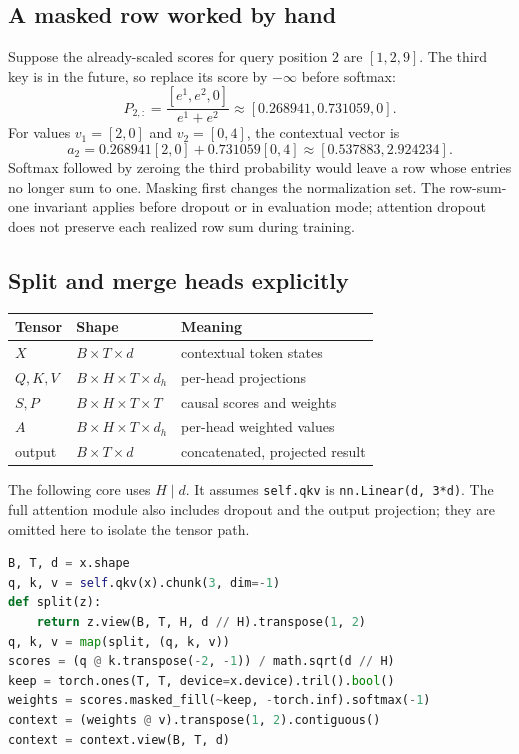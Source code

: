 \documentclass[11pt]{article}
\begin{document}
\subsection{A masked row worked by hand}
Suppose the already-scaled scores for query position $2$ are $[1,2,9]$. The
third key is in the future, so replace its score by $-\infty$ before softmax:
\[
P_{2,:}=\frac{[e^1,e^2,0]}{e^1+e^2}
\approx[0.268941,0.731059,0].
\]
For values $v_1=[2,0]$ and $v_2=[0,4]$, the contextual vector is
\[
a_2=0.268941[2,0]+0.731059[0,4]
\approx[0.537883,2.924234].
\]
Softmax followed by zeroing the third probability would leave a row whose
entries no longer sum to one. Masking first changes the normalization set.
The row-sum-one invariant applies before dropout or in evaluation mode;
attention dropout does not preserve each realized row sum during training.

\subsection{Split and merge heads explicitly}

\begin{center}
\begin{tabular}{lll}
\toprule
Tensor & Shape & Meaning \\
\midrule
$X$ & $B\times T\times d$ & contextual token states \\
$Q,K,V$ & $B\times H\times T\times d_h$ & per-head projections \\
$S,P$ & $B\times H\times T\times T$ & causal scores and weights \\
$A$ & $B\times H\times T\times d_h$ & per-head weighted values \\
output & $B\times T\times d$ & concatenated, projected result \\
\bottomrule
\end{tabular}
\end{center}

The following core uses $H\mid d$. It assumes \texttt{self.qkv} is
\texttt{nn.Linear(d, 3*d)}. The full attention module also includes dropout
and the output projection; they are omitted here to isolate the tensor path.
\begin{lstlisting}[language=Python]
B, T, d = x.shape
q, k, v = self.qkv(x).chunk(3, dim=-1)
def split(z):
    return z.view(B, T, H, d // H).transpose(1, 2)
q, k, v = map(split, (q, k, v))
scores = (q @ k.transpose(-2, -1)) / math.sqrt(d // H)
keep = torch.ones(T, T, device=x.device).tril().bool()
weights = scores.masked_fill(~keep, -torch.inf).softmax(-1)
context = (weights @ v).transpose(1, 2).contiguous()
context = context.view(B, T, d)
\end{lstlisting}
\end{document}
